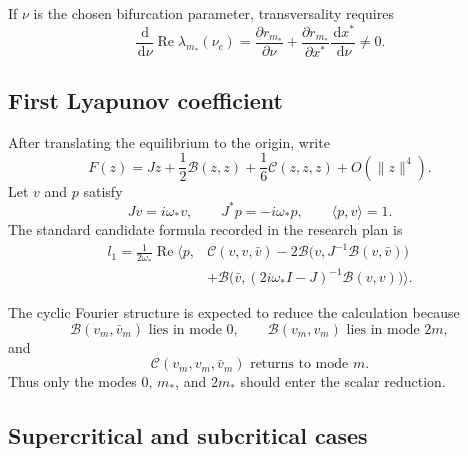 \documentclass[11pt, reqno]{amsart}
\theoremstyle{definition}
\theoremstyle{remark}
\newcommand{\Ree}{\operatorname{Re}}
\newcommand{\dd}{\,\mathrm{d}}
\begin{document}
	If $\nu$ is the chosen bifurcation parameter, transversality requires
	\begin{equation}
		\label{eq:transversality}
		\frac{\dd}{\dd\nu}\Ree\lambda_{m_*}(\nu_c)
		=
		\frac{\partial r_{m_*}}{\partial\nu}
		+
		\frac{\partial r_{m_*}}{\partial x^*}
		\frac{\dd x^*}{\dd\nu}
		\ne0.
	\end{equation}
	
	
	\subsection{First Lyapunov coefficient}
	
	After translating the equilibrium to the origin, write
	\begin{equation}
		\label{eq:Taylor-vector-field}
		F(z)
		=
		Jz
		+\frac12\mathcal B(z,z)
		+\frac16\mathcal C(z,z,z)
		+O(\|z\|^4).
	\end{equation}
	Let $v$ and $p$ satisfy
	\[
	Jv=i\omega_*v,
	\qquad
	J^*p=-i\omega_*p,
	\qquad
	\langle p,v\rangle=1.
	\]
	The standard candidate formula recorded in the research plan is
	\begin{align}
		\label{eq:first-Lyapunov}
		l_1
		=
		\frac{1}{2\omega_*}
		\Ree\Big\langle p,
		&\mathcal C(v,v,\bar v)
		-2\mathcal B\bigl(v,J^{-1}\mathcal B(v,\bar v)\bigr)
		\\
		&+\mathcal B\bigl(\bar v,(2i\omega_*I-J)^{-1}
		\mathcal B(v,v)\bigr)
		\Big\rangle.
	\end{align}
	
	The cyclic Fourier structure is expected to reduce the calculation because
	\[
	\mathcal B(v_m,\bar v_m)\text{ lies in mode }0,
	\qquad
	\mathcal B(v_m,v_m)\text{ lies in mode }2m,
	\]
	and
	\[
	\mathcal C(v_m,v_m,\bar v_m)\text{ returns to mode }m.
	\]
	Thus only the modes $0$, $m_*$, and $2m_*$ should enter the scalar reduction.
	
	
	\subsection{Supercritical and subcritical cases}
	
\end{document}
